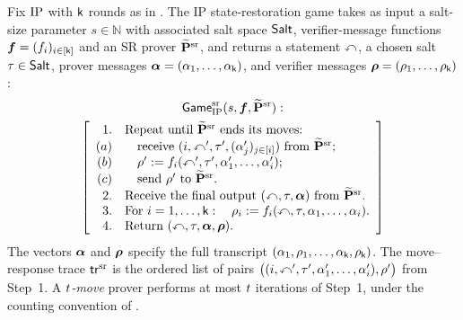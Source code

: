 \begin{definition}
  \label{def:ip_state_restoration_game}
  Fix \(\mathrm{IP}\) with \(\mathsf{k}\) rounds as in . The IP state-restoration game takes as input a salt-size parameter \(s\in\mathbb N\) with associated salt space \(\mathsf{Salt}\), verifier-message functions \(\boldsymbol{f}=(f_{i})_{i\in[\mathsf{k}]}\) and an SR prover \(\widetilde{\mathbf P}^{\mathrm{sr}}\), and returns a statement \(\mathbb{x}\), a chosen salt \(\tau\in\mathsf{Salt}\), prover messages \(\boldsymbol{\alpha}=(\alpha_1,\ldots,\alpha_{\mathsf{k}})\), and verifier messages \(\boldsymbol{\rho}=(\rho_1,\ldots,\rho_{\mathsf{k}})\):
  \[
  \begin{gathered}
  \mathsf{Game}^{\mathrm{sr}}_{\mathrm{IP}}(s,\boldsymbol{f},\widetilde{\mathbf P}^{\mathrm{sr}}):\\
  \left[\begin{array}{rl}
    1. & \text{Repeat until }\widetilde{\mathbf P}^{\mathrm{sr}}\text{ ends its moves:}\\
    (a) & \quad\text{receive }(i,\mathbb{x}',\tau',(\alpha'_j)_{j\in[i]})
      \text{ from }\widetilde{\mathbf P}^{\mathrm{sr}};\\
    (b) & \quad\rho':=f_{i}(\mathbb{x}',\tau',\alpha'_1,\ldots,\alpha'_{i});\\
    (c) & \quad\text{send }\rho'\text{ to }\widetilde{\mathbf P}^{\mathrm{sr}}.\\
    2. & \text{Receive the final output }(\mathbb{x},\tau,\boldsymbol{\alpha})
      \text{ from }\widetilde{\mathbf P}^{\mathrm{sr}}.\\
    3. & \text{For }i=1,\ldots,\mathsf{k}:
      \quad\rho_{i}:=f_{i}(\mathbb{x},\tau,\alpha_1,\ldots,\alpha_{i}).\\
    4. & \text{Return }(\mathbb{x},\tau,\boldsymbol{\alpha},\boldsymbol{\rho}).
  \end{array}\right]
  \end{gathered}
  \]
  The vectors \(\boldsymbol{\alpha}\) and \(\boldsymbol{\rho}\) specify the full transcript \((\alpha_1,\rho_1,\ldots,\alpha_{\mathsf{k}},\rho_{\mathsf{k}})\). The move--response trace \(\mathsf{tr}^{\mathrm{sr}}\) is the ordered list of pairs \(\bigl((i,\mathbb{x}',\tau',\alpha'_1,\ldots,\alpha'_{i}),\rho'\bigr)\) from Step~1. A \emph{\(t\)-move} prover performs at most \(t\) iterations of Step~1, under the counting convention of .
  \leanok
\end{definition}

